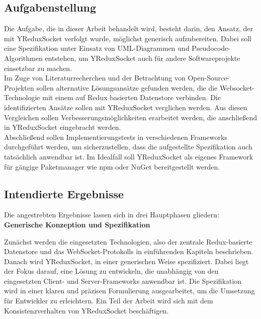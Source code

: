 \documentclass[12pt]{article} %
\begin{document}
\subsection{Aufgabenstellung}
\label{jobdefinition}

Die Aufgabe, die in dieser Arbeit behandelt wird, besteht darin, den Ansatz, der mit YReduxSocket verfolgt wurde, möglichst generisch aufzubereiten. Dabei soll eine Spezifikation unter Einsatz von UML-Diagrammen und Pseudocode-Algorithmen entstehen, um YReduxSocket auch für andere Softwareprojekte einsetzbar zu machen.  \\

Im Zuge von Literaturrecherchen und der Betrachtung von Open-Source-Projekten sollen alternative Lösungsansätze gefunden werden, die die Websocket-Technologie mit einem auf Redux basierten Datenstore verbinden. Die identifizierten Ansätze sollen mit YReduxSocket verglichen werden. Aus diesen Vergleichen sollen Verbesserungsmöglichkeiten erarbeitet werden, die anschließend in YReduxSocket eingebracht werden. \\

Abschließend sollen Implementierungstests in verschiedenen Frameworks durchgeführt werden, um sicherzustellen, dass die aufgestellte Spezifikation auch tatsächlich anwendbar ist. Im Idealfall soll YReduxSocket als eigenes Framework für gängige Paketmanager wie npm oder NuGet bereitgestellt werden. 

\subsection{Intendierte Ergebnisse}
\label{results}

Die angestrebten Ergebnisse lassen sich in drei Hauptphasen gliedern:
\\

\textbf{Generische Konzeption und Spezifikation} 

Zunächst werden die eingesetzten Technologien, also der zentrale Redux-basierte Datenstore und das WebSocket-Protokolls in einführenden Kapiteln beschrieben.
Danach wird YReduxSocket, in einer generischen Weise spezifiziert. Dabei liegt der Fokus darauf, eine Lösung zu entwickeln, die unabhängig von den eingesetzten Client- und Server-Frameworks anwendbar ist. Die Spezifikation wird in einer klaren und präzisen Formulierung ausgearbeitet, um die Umsetzung für Entwickler zu erleichtern. Ein Teil der Arbeit wird sich mit dem Konsistenzverhalten von YReduxSocket beschäftigen. \\
\end{document}

